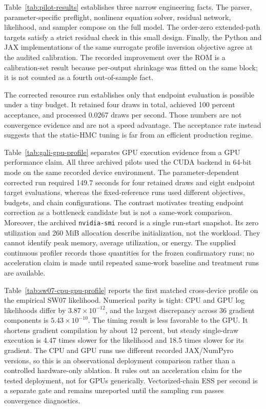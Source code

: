 \documentclass[11pt]{article}
\begin{document}






Table~\ref{tab:pilot-results} establishes three narrow engineering facts. The parser, parameter-specific
preflight, nonlinear equation solver, residual network, likelihood, and sampler
compose on the full model. The order-zero extended-path targets satisfy a strict
residual check in this small design. Finally, the Python and JAX implementations
of the same surrogate profile inversion objective agree at the audited
calibration. The recorded improvement over the ROM is a calibration-set result
because per-output shrinkage was fitted on the same block; it is not counted as
a fourth out-of-sample fact.

The corrected resource run establishes only that endpoint evaluation is
possible under a tiny budget. It retained four draws in total, achieved 100
percent acceptance, and processed 0.0267 draws per second. Those numbers are not
convergence evidence and are not a speed advantage. The acceptance rate instead
suggests that the static-HMC tuning is far from an efficient production regime.

Table~\ref{tab:gali-gpu-profile} separates GPU execution evidence from a GPU
performance claim. All three archived pilots used the CUDA backend in 64-bit
mode on the same recorded device environment. The parameter-dependent corrected
run required 149.7 seconds for four retained draws and eight endpoint target
evaluations, whereas the fixed-reference runs used different objectives,
budgets, and chain configurations. The contrast motivates treating endpoint
correction as a bottleneck candidate but is not a same-work comparison.
Moreover, the
archived \texttt{nvidia-smi} record is a single run-start snapshot. Its zero
utilization and 260 MiB allocation describe initialization, not the workload.
They cannot identify peak memory, average utilization, or energy. The supplied
continuous profiler records those quantities for the frozen confirmatory runs;
no acceleration claim is made until repeated same-work baseline and treatment
runs are available.

Table~\ref{tab:sw07-cpu-gpu-profile} reports the first matched cross-device
profile on the empirical SW07 likelihood. Numerical parity is tight: CPU and GPU
log likelihoods differ by $3.87\times10^{-12}$, and the largest discrepancy
across 36 gradient components is $5.43\times10^{-10}$. The timing result is less
favorable to the GPU. It shortens gradient compilation by about 12 percent, but
steady single-draw execution is 4.47 times slower for the likelihood and 18.5
times slower for its gradient. The CPU and GPU runs use different recorded
JAX/NumPyro versions, so this is an observational deployment comparison rather
than a controlled hardware-only ablation. It rules out an acceleration claim
for the tested deployment, not for GPUs generically. Vectorized-chain ESS per
second is a separate gate and remains unreported until the sampling run passes
convergence diagnostics.
\end{document}
